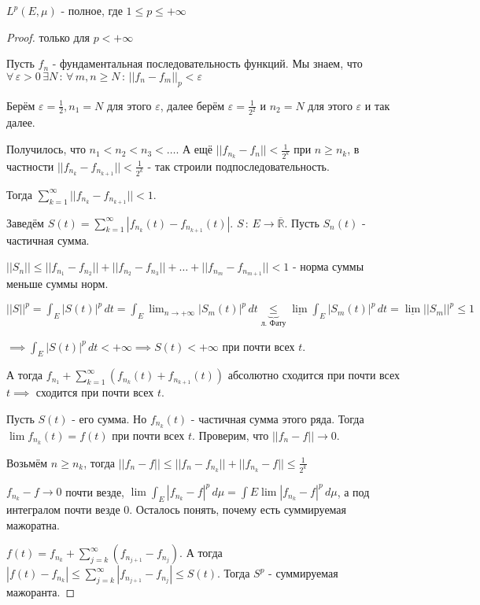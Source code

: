 \begin{theorem}
    $L^p (E, \mu)$ - полное, где $1 \leqslant p \leqslant +\infty$
\end{theorem}

\begin{proof}
    только для $p < +\infty$

    Пусть $f_n$ - фундаментальная последовательность функций. Мы знаем, что 
    $\forall \, \varepsilon > 0 \, \exists N \, : \, \forall \, m, n \geqslant N \, : \, ||f_n - f_m||_p < \varepsilon$

    Берём $\varepsilon = \frac{1}{2}, n_1 = N$ для этого $\varepsilon$, далее берём $\varepsilon = \frac{1}{2^2}$ и $n_2 = N$ для этого $\varepsilon$ и так далее.

    Получилось, что $n_1 < n_2 < n_3 < \ldots$. А ещё $||f_{n_k} - f_n|| < \frac{1}{2^k}$ при $n \geqslant n_k$, в частности
    $||f_{n_k} - f_{n_{k + 1}}|| < \frac{1}{2^k}$ - так строили подпоследовательность.

    Тогда $\sum_{k = 1}^\infty ||f_{n_{k}} - f_{n_{k + 1}}|| < 1$.

    Заведём $S(t) = \sum_{k = 1}^\infty |f_{n_{k}}(t) - f_{n_{k + 1}}(t)|$. $S \, : \, E \to \overline{\mathbb{R}}$. Пусть 
    $S_n(t)$ - частичная сумма.

    $||S_n|| \leqslant ||f_{n_1} - f_{n_2}|| + ||f_{n_2} - f_{n_3}|| + \ldots + ||f_{n_m} - f_{n_{m + 1}}|| < 1$ - норма суммы меньше суммы норм.

    $||S||^p = \int_{E} |S(t)|^p \, dt = \int_E \lim_{n \to +\infty} |S_m(t)|^p \, dt \underbrace{\leqslant}_{\text{л. Фату}} \underline{\lim} \int_E |S_m(t)|^p \, dt = 
    \underline{\lim} ||S_m ||^p \leqslant 1 $
    
    $ \implies \int_E |S(t)|^p \, dt < +\infty \implies S(t) < +\infty$ при почти всех $t$.

    А тогда $f_{n_1} + \sum_{k = 1}^\infty (f_{n_k}(t) + f_{n_{k + 1}}(t))$ абсолютно сходится при почти всех $t \implies $ сходится при почти всех $t$.

    Пусть $S(t)$ - его сумма. Но $f_{n_k}(t)$ - частичная сумма этого ряда. Тогда
    $\lim f_{n_k} (t) = f(t)$ при почти всех $t$. Проверим, что $||f_n - f|| \rightarrow 0$.

    Возьмём $n \geqslant n_k$, тогда $||f_n - f|| \leqslant ||f_n - f_{n_k}|| + ||f_{n_k} - f|| \leqslant \frac{1}{2^k}$

    $f_{n_k} - f \rightarrow 0$ почти везде, $\lim \int_E |f_{n_k} - f|^p \, d\mu = \int E \lim |f_{n_k} - f|^p \, d\mu$, а под интегралом 
    почти везде 0. Осталось понять, почему есть суммируемая мажоратна.

    $f(t) = f_{n_k} + \sum_{j = k}^\infty (f_{n_{j + 1}} - f_{n_j})$. А тогда $|f(t) - f_{n_k}| \leqslant \sum_{j = k}^\infty |f_{n_{j + 1}} - f_{n_j} | \leqslant S(t)$. Тогда $S^p$ - суммируемая мажоранта.
\end{proof}

